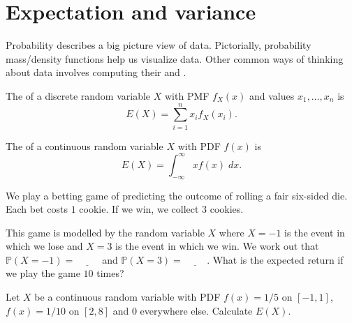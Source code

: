 \documentclass[../main.tex]{subfiles}
\begin{document}
 \section{Expectation and variance}

Probability describes a big picture view of data. Pictorially, probability mass/density functions help us visualize data. Other common ways of thinking about data involves computing their  and . 

\begin{definition}[expectation]
  The  of a discrete random variable \(X\) with PMF \(f_{X}(x)\) and values \(x_{1}, \ldots, x_{n}\) is
  \begin{equation} \label{eq:expectation-discrete}
    E(X) = \sum_{i = 1}^{n} x_{i} f_{X}(x_{i}).
  \end{equation}

  The  of a continuous random variable \(X\) with PDF \(f(x)\) is
  \begin{equation} \label{eq:expectation-continuous}
    E(X) = \int_{-\infty}^{\infty} x f(x) \;dx.
  \end{equation}
\end{definition}

\begin{example} \label{ex:variance-discrete-betting}
  We play a betting game of predicting the outcome of rolling a fair six-sided die.  Each bet costs \(1\) cookie. If we win, we collect \(3\) cookies.

  This game is modelled by the random variable \(X\) where \(X = -1\) is the event in which we lose and \(X = 3\) is the event in which we win. We work out that \(\mathbb{P}(X = -1) = \underline{\hspace{1cm}}\) and \(\mathbb{P}(X = 3) = \underline{\hspace{1cm}}\).  What is the expected return if we play the game \(10\) times?

\end{example}

\begin{example} \label{ex:variance-continuous-uniform}
  Let \(X\) be a continuous random variable with PDF \(f(x) = 1/5\) on \([-1, 1]\), \(f(x) = 1/10\) on \([2,8]\) and \(0\) everywhere else.  Calculate \(E(X)\).

  \blanks*
\end{example}
\clearpage
\end{document}
